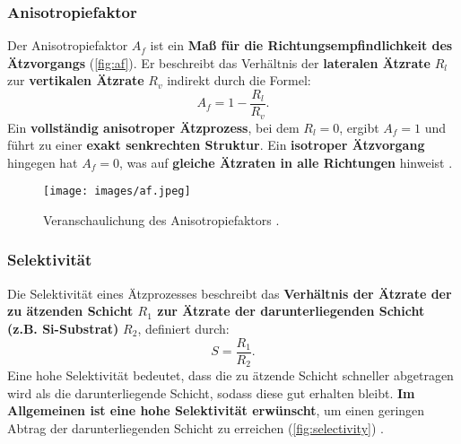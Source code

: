 \documentclass{article} %
\begin{document}


\vspace{1em}

\subsubsection{Anisotropiefaktor}

Der Anisotropiefaktor $A_f$ ist ein \textbf{Maß für die Richtungsempfindlichkeit des Ätzvorgangs} (\autoref{fig:af}). Er beschreibt das Verhältnis der \textbf{lateralen Ätzrate} $R_l$ zur \textbf{vertikalen Ätzrate} $R_v$ indirekt durch die Formel:
$$
A_f = 1 - \frac{R_l}{R_v}.
$$
Ein \textbf{vollständig anisotroper Ätzprozess}, bei dem $R_l = 0$, ergibt $A_f = 1$ und führt zu einer \textbf{exakt senkrechten Struktur}. Ein \textbf{isotroper Ätzvorgang} hingegen hat $A_f = 0$, was auf \textbf{gleiche Ätzraten in alle Richtungen} hinweist \cite{schmid2024Aetzen}.

\begin{figure}[htb!]
    \centering
    \texttt{[image: images/af.jpeg]} %
    \captionsetup{labelfont=bf, width=.9\textwidth} %
    \caption{Veranschaulichung des Anisotropiefaktors \cite{schmid2024Aetzen}.}
    \label{fig:af}
\end{figure}





\vspace{1em}

\subsubsection{Selektivität}

Die Selektivität eines Ätzprozesses beschreibt das \textbf{Verhältnis der Ätzrate der zu ätzenden Schicht $R_1$ zur Ätzrate der darunterliegenden Schicht (z.B. Si-Substrat)} $R_2$, definiert durch:
$$
S = \frac{R_1}{R_2}.
$$
Eine hohe Selektivität bedeutet, dass die zu ätzende Schicht schneller abgetragen wird als die darunterliegende Schicht, sodass diese gut erhalten bleibt. \textbf{Im Allgemeinen ist eine hohe Selektivität erwünscht}, um einen geringen Abtrag der darunterliegenden Schicht zu erreichen (\autoref{fig:selectivity}) \cite{schmid2024Aetzen}.
\end{document}
